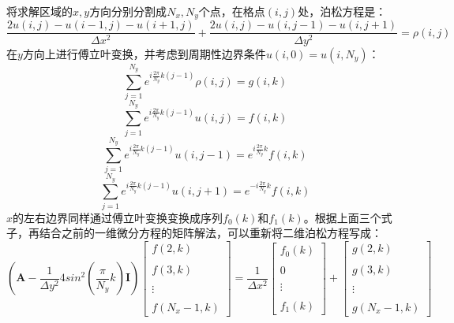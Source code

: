 \documentclass[paper=a4, fontsize=11pt]{scrartcl} %
\numberwithin{equation}{section} %
\numberwithin{figure}{section} %
\numberwithin{table}{section} %
\begin{document}
\begin{CJK*}{UTF8}{gbsn}
将求解区域的$x,y$方向分别分割成$N_x,N_y$个点，在格点$(i,j)$处，泊松方程是：
\begin{equation}
\frac{2u(i,j)-u(i-1,j)-u(i+1,j)}{\Delta x^2}+\frac{2u(i,j)-u(i,j-1)-u(i,j+1)}{\Delta y^2}=\rho(i,j)
\end{equation}
在$y$方向上进行傅立叶变换，并考虑到周期性边界条件$u(i,0)=u(i,N_y)$：
\begin{equation}
\sum_{j=1}^{N_y}e^{i\frac{2\pi}{N_y}k(j-1)}\rho(i,j) = g(i,k)
\end{equation}
\begin{equation}
\sum_{j=1}^{N_y}e^{i\frac{2\pi}{N_y}k(j-1)}u(i,j) = f(i,k)
\end{equation}
\begin{equation}
\sum_{j=1}^{N_y}e^{i\frac{2\pi}{N_y}k(j-1)}u(i,j-1) = e^{i\frac{2\pi}{N_y}k} f(i,k)
\end{equation}
\begin{equation}
\sum_{j=1}^{N_y}e^{i\frac{2\pi}{N_y}k(j-1)}u(i,j+1) = e^{-i\frac{2\pi}{N_y}k} f(i,k)
\end{equation}
$x$的左右边界同样通过傅立叶变换变换成序列$f_0(k)$和$f_1(k)$。根据上面三个式子，再结合之前的一维微分方程的矩阵解法，可以重新将二维泊松方程写成：
\begin{equation}
(\mathbf{A}-\frac{1}{\Delta y^2}4sin^2(\frac{\pi}{N_y}k) \mathbf{I}) \begin{bmatrix}
f(2, k) \\\\ f(3, k) \\\\ \vdots \\\\ f(N_x-1, k) \end{bmatrix} = \frac{1}{\Delta x^2} \begin{bmatrix} f_0(k) \\\\ 0 \\\\ \vdots \\\\ f_1(k) \end{bmatrix} + \begin{bmatrix} g(2, k) \\\\ g(3,k) \\\\ \vdots \\\\ g(N_x-1, k) \end{bmatrix}
\end{equation} 

\end{CJK*}
\end{document}
